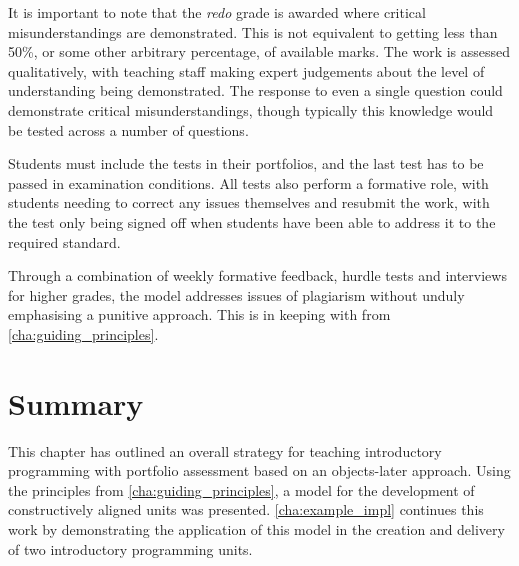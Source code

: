 It is important to note that the \emph{redo} grade is awarded where critical misunderstandings are demonstrated. This is not equivalent to getting less than 50\%, or some other arbitrary percentage, of available marks. The work is assessed qualitatively, with teaching staff making expert judgements about the level of understanding being demonstrated. The response to even a single question could demonstrate critical misunderstandings, though typically this knowledge would be tested across a number of questions.

Students must include the tests in their portfolios, and the last test has to be passed in examination conditions. All tests also perform a formative role, with students needing to correct any issues themselves and resubmit the work, with the test only being signed off when students have been able to address it to the required standard.

Through a combination of weekly formative feedback, hurdle tests and interviews for higher grades, the model addresses issues of plagiarism without unduly emphasising a punitive approach. This is in keeping with  from \cref{cha:guiding_principles}.


\section{Summary} %
\label{sec:ca_summary}


%
%

This chapter has outlined an overall strategy for teaching introductory programming with portfolio assessment based on an objects-later approach. Using the principles from \cref{cha:guiding_principles}, a model for the development of constructively aligned units was presented. \cref{cha:example_impl} continues this work by demonstrating the application of this model in the creation and delivery of two introductory programming units.


